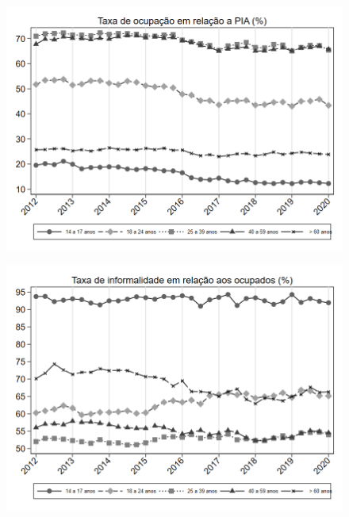 \begin{frame}[label=_composicao_demografica_faixa_etaria_taxa_de_ocupacao]{}
\textit{\hyperlink{_composicao_demografica_faixa_etaria}{}}
\begin{figure}
  \centering
  \includegraphics[width=1\linewidth]{../../analysis/output/composicao_demografica/faixa_etaria/_composicao_demografica_faixa_etaria_taxa_de_ocupacao.png}
  \caption{}
  \label{fig:_composicao_demografica_faixa_etaria_taxa_de_ocupacao}
\end{figure}
\end{frame}

\begin{frame}[label=_composicao_demografica_faixa_etaria_taxa_de_informalidade]{}
\textit{\hyperlink{_composicao_demografica_faixa_etaria}{}}
\begin{figure}
  \centering
  \includegraphics[width=1.0\linewidth]{../../analysis/output/composicao_demografica/faixa_etaria/_composicao_demografica_faixa_etaria_taxa_de_informalidade.png}
  \caption{}
  \label{fig:_composicao_demografica_faixa_etaria_taxa_de_informalidade}
\end{figure}
\end{frame}

